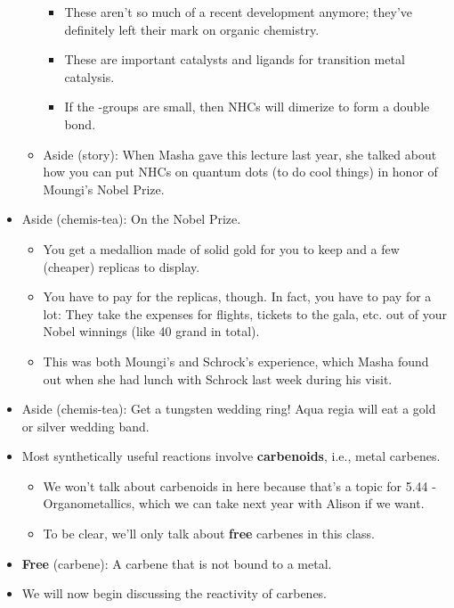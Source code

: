 \documentclass[../notes.tex]{subfiles}
\begin{document}
\begin{itemize}
\begin{itemize}
        \begin{itemize}
            \item These aren't so much of a recent development anymore; they've definitely left their mark on organic chemistry.
            \item These are important catalysts and ligands for transition metal catalysis.
            \item If the -groups are small, then NHCs will dimerize to form a double bond.
        \end{itemize}
        \item Aside (story): When Masha gave this lecture last year, she talked about how you can put NHCs on quantum dots (to do cool things) in honor of Moungi's Nobel Prize.
    \end{itemize}
    \item Aside (chemis-tea): On the Nobel Prize.
    \begin{itemize}
        \item You get a medallion made of solid gold for you to keep and a few (cheaper) replicas to display.
        \item You have to pay for the replicas, though. In fact, you have to pay for a lot: They take the expenses for flights, tickets to the gala, etc. out of your Nobel winnings (like 40 grand in total).
        \item This was both Moungi's and Schrock's experience, which Masha found out when she had lunch with Schrock last week during his visit.
    \end{itemize}
    \item Aside (chemis-tea): Get a tungsten wedding ring! Aqua regia will eat a gold or silver wedding band.
    \item Most synthetically useful reactions involve \textbf{carbenoids}, i.e., metal carbenes.
    \begin{itemize}
        \item We won't talk about carbenoids in here because that's a topic for 5.44 - Organometallics, which we can take next year with Alison if we want.
        \item To be clear, we'll only talk about \textbf{free} carbenes in this class.
    \end{itemize}
    \item \textbf{Free} (carbene): A carbene that is not bound to a metal.
    \item We will now begin discussing the reactivity of carbenes.
    \begin{itemize}

\end{itemize}
\end{itemize}
\end{document}
